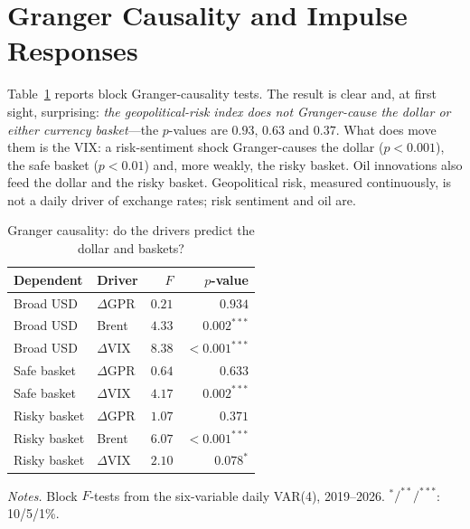 \section{Granger Causality and Impulse Responses}
\label{sec:svar_irf_full}

Table~\ref{tab:var_granger} reports block Granger-causality tests. The result is clear and,
at first sight, surprising: \emph{the geopolitical-risk index does not Granger-cause the
dollar or either currency basket}---the $p$-values are $0.93$, $0.63$ and $0.37$. What does
move them is the VIX: a risk-sentiment shock Granger-causes the dollar ($p<0.001$), the
safe basket ($p<0.01$) and, more weakly, the risky basket. Oil innovations also feed the
dollar and the risky basket. Geopolitical risk, measured continuously, is not a daily
driver of exchange rates; risk sentiment and oil are.

\begin{table}[htbp]
\centering
\begin{threeparttable}
\caption{Granger causality: do the drivers predict the dollar and baskets?}
\label{tab:var_granger}
\small
\begin{tabular}{ll rr}
\toprule
Dependent & Driver & $F$ & $p$-value \\
\midrule
Broad USD     & $\Delta$GPR & $0.21$ & $0.934$ \\
Broad USD     & Brent       & $4.33$ & $0.002^{***}$ \\
Broad USD     & $\Delta$VIX & $8.38$ & $<0.001^{***}$ \\
\addlinespace
Safe basket   & $\Delta$GPR & $0.64$ & $0.633$ \\
Safe basket   & $\Delta$VIX & $4.17$ & $0.002^{***}$ \\
\addlinespace
Risky basket  & $\Delta$GPR & $1.07$ & $0.371$ \\
Risky basket  & Brent       & $6.07$ & $<0.001^{***}$ \\
Risky basket  & $\Delta$VIX & $2.10$ & $0.078^{*}$ \\
\bottomrule
\end{tabular}
\begin{tablenotes}[flushleft]\footnotesize
\item \textit{Notes.} Block $F$-tests from the six-variable daily VAR(4), 2019--2026.
$^{*}/^{**}/^{***}$: 10/5/1\%.
\end{tablenotes}
\end{threeparttable}
\end{table}

